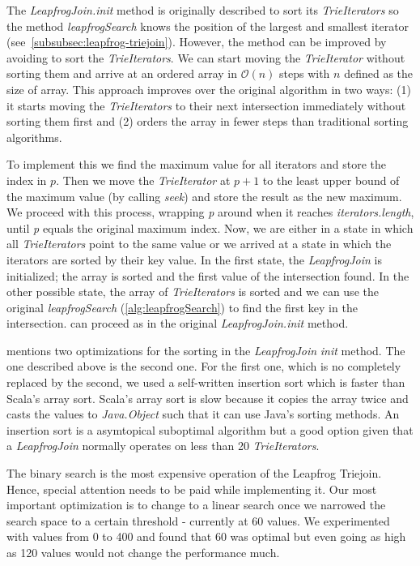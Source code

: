 The \textit{LeapfrogJoin.init} method is originally described to sort its \textit{TrieIterators} so the method
\textit{leapfrogSearch} knows the position of the largest and smallest iterator (see~\cref{subsubsec:leapfrog-triejoin}).
However, the method can be improved by avoiding to sort the \textit{TrieIterators}.
We can start moving the \textit{TrieIterator} without sorting them and arrive at an ordered array in $\mathcal{O} (n)$ steps with $n$
defined as the size of array.
This approach improves over the original algorithm in two ways: (1) it starts moving the \textit{TrieIterators} to their next intersection
immediately without sorting them first and
(2) orders the array in fewer steps than traditional sorting algorithms.

To implement this we find the maximum value for  all iterators and store the index in $p$.
Then we move the \textit{TrieIterator} at $p + 1$ to the least upper bound of the maximum value (by calling \textit{seek}) and store the
result as the new maximum.
We proceed with this process, wrapping \textit{p} around when it reaches \textit{iterators.length}, until \textit{p} equals the original
maximum index.
Now, we are either in a state in which all \textit{TrieIterators} point to the same value or we arrived at a state in which the iterators
are sorted by their key value.
In the first state, the \textit{LeapfrogJoin} is initialized;
the array is sorted and the first value of the intersection found.
In the other possible state, the array of \textit{TrieIterators} is sorted and we can use the original \textit{leapfrogSearch}
(\cref{alg:leapfrogSearch}) to find the first key in the intersection.
can proceed as in the original \textit{LeapfrogJoin.init} method.

 mentions two optimizations for the sorting in the \textit{LeapfrogJoin} \textit{init} method.
The one described above is the second one.
For the first one, which is no completely replaced by the second, we used a self-written insertion sort which is faster than
Scala's array sort.
Scala's array sort is slow because it copies the array twice and casts the values to \textit{Java.Object} such that it can use Java's
sorting methods.
An insertion sort is a asymtopical suboptimal algorithm but a good option given that a \textit{LeapfrogJoin} normally operates on less
than 20 \textit{TrieIterators}.

The binary search is the most expensive operation of the Leapfrog Triejoin.
Hence, special attention needs to be paid while implementing it.
Our most important optimization is to change to a linear search once we narrowed the search space
to a certain threshold - currently at 60 values.
We experimented with values from 0 to 400 and found that 60 was optimal but even going as high as 120 values would not change the performance much.

